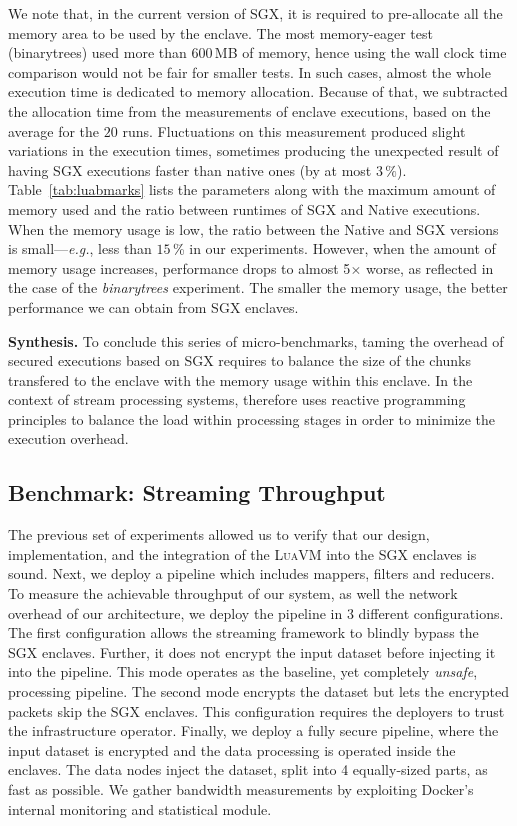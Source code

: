 We note that, in the current version of SGX, it is required to pre-allocate all the memory area to be used by the enclave.
The most memory-eager test (\textsf{binarytrees}) used more than $600$\,MB of memory, hence using the wall clock time comparison would not be fair for smaller tests.
In such cases, almost the whole execution time is dedicated to memory allocation.
Because of that, we subtracted the allocation time from the measurements of enclave executions, based on the average for the $20$ runs.
Fluctuations on this measurement produced slight variations in the execution times, sometimes producing the unexpected result of having SGX executions faster than native ones (by at most $3\,\%$).
Table~\ref{tab:luabmarks} lists the parameters along with the maximum amount of memory used and the ratio between runtimes of SGX and Native executions.
When the memory usage is low, the ratio between the Native and SGX versions is small---\emph{e.g.}, less than $15$\,\% in our experiments.
However, when the amount of memory usage increases, performance drops to almost 5$\times$ worse, as reflected in the case of the \emph{binarytrees} experiment.
The smaller the memory usage, the better performance we can obtain from SGX enclaves.

\vspace{10pt}\noindent\textbf{Synthesis.}
To conclude this series of micro-benchmarks, taming the overhead of secured executions based on SGX requires to balance the size of the chunks transfered to the enclave with the memory usage within this enclave.
In the context of stream processing systems, \SYS{} therefore uses reactive programming principles to balance the load within processing stages in order to minimize the execution overhead.


\subsection{Benchmark: Streaming Throughput}

The previous set of experiments allowed us to verify that our design, implementation, and the integration of the \textsc{LuaVM} into the SGX enclaves is sound.
Next, we deploy a \SYS{} pipeline which includes mappers, filters and reducers.
To measure the achievable throughput of our system, as well the network overhead of our architecture, we deploy the \SYS{} pipeline in 3 different configurations.
The first configuration allows the streaming framework to blindly bypass the SGX enclaves.
Further, it does not encrypt the input dataset before injecting it into the pipeline.
This mode operates as the baseline, yet completely \emph{unsafe}, processing pipeline.
The second mode encrypts the dataset but lets the encrypted packets skip the SGX enclaves.
This configuration requires the deployers to trust the infrastructure operator.
Finally, we deploy a fully secure pipeline, where the input dataset is encrypted and the data processing is operated inside the enclaves.
The data nodes inject the dataset, split into 4 equally-sized parts, as fast as possible.
We gather bandwidth measurements by exploiting Docker's internal monitoring and statistical module.

